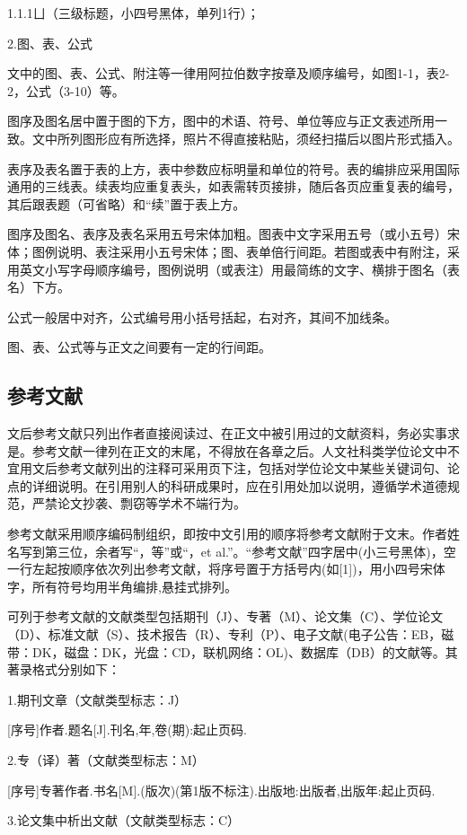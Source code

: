 1.1.1ㄩ（三级标题，小四号黑体，单列1行）；

2.图、表、公式

文中的图、表、公式、附注等一律用阿拉伯数字按章及顺序编号，如图1-1，表2-2，公式（3-10）等。

图序及图名居中置于图的下方，图中的术语、符号、单位等应与正文表述所用一致。文中所列图形应有所选择，照片不得直接粘贴，须经扫描后以图片形式插入。

表序及表名置于表的上方，表中参数应标明量和单位的符号。表的编排应采用国际通用的三线表。续表均应重复表头，如表需转页接排，随后各页应重复表的编号，其后跟表题（可省略）和“续”置于表上方。

图序及图名、表序及表名采用五号宋体加粗。图表中文字采用五号（或小五号）宋体；图例说明、表注采用小五号宋体；图、表单倍行间距。若图或表中有附注，采用英文小写字母顺序编号，图例说明（或表注）用最简练的文字、横排于图名（表名）下方。

公式一般居中对齐，公式编号用小括号括起，右对齐，其间不加线条。

图、表、公式等与正文之间要有一定的行间距。
\subsection{参考文献}
文后参考文献只列出作者直接阅读过、在正文中被引用过的文献资料，务必实事求是。参考文献一律列在正文的末尾，不得放在各章之后。人文社科类学位论文中不宜用文后参考文献列出的注释可采用页下注，包括对学位论文中某些关键词句、论点的详细说明。在引用别人的科研成果时，应在引用处加以说明，遵循学术道德规范，严禁论文抄袭、剽窃等学术不端行为。

参考文献采用顺序编码制组织，即按中文引用的顺序将参考文献附于文末。作者姓名写到第三位，余者写“，等”或“，et al.”。“参考文献”四字居中(小三号黑体)，空一行左起按顺序依次列出参考文献，将序号置于方括号内(如[1])，用小四号宋体字，所有符号均用半角编排,悬挂式排列。

可列于参考文献的文献类型包括期刊（J）、专著（M）、论文集（C）、学位论文（D）、标准文献（S）、技术报告（R）、专利（P）、电子文献(电子公告：EB，磁带：DK，磁盘：DK，光盘：CD，联机网络：OL)、数据库（DB）的文献等。其著录格式分别如下：

1.期刊文章（文献类型标志：J）

[序号]作者.题名[J].刊名,年,卷(期):起止页码.

2.专（译）著（文献类型标志：M）

[序号]专著作者.书名[M].(版次)(第1版不标注).出版地:出版者,出版年:起止页码.

3.论文集中析出文献（文献类型标志：C）

